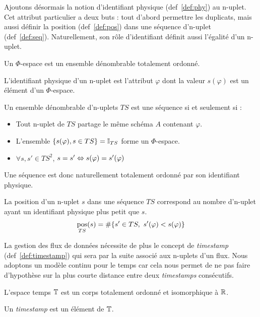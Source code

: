Ajoutons désormais la notion d'identifiant physique (def~\ref{def:phy}) au n-uplet. Cet attribut particulier a deux buts : tout d'abord permettre les duplicats, mais aussi définir la position (def~\ref{def:pos}) dans une séquence d'n-uplet (def~\ref{def:seq}). Naturellement, son rôle d'identifiant définit aussi l'égalité d'un n-uplet.
\begin{defi}\label{def:phy}
    Un $\Phi$-espace est un ensemble dénombrable totalement ordonné.

    L'identifiant physique d'un n-uplet est l'attribut $\varphi$ dont la valeur $s(\varphi)$ est un élément d'un $\Phi$-espace.
\end{defi}
\begin{defi}\label{def:seq}
    Un ensemble dénombrable d'n-uplets $TS$ est une séquence si et seulement si : 
    \begin{itemize}
     \item Tout n-uplet de $TS$ partage le même schéma $A$ contenant $\varphi$.
     \item L'ensemble $\{s(\varphi), s\in TS\} = \mathbb{I}_{TS}$ forme un $\Phi$-espace.
     \item $\forall s,s' \in TS^2$, $s = s' \Leftrightarrow s(\varphi) = s'(\varphi)$
    \end{itemize}

    Une séquence est donc naturellement totalement ordonné par son identifiant physique.
\end{defi}
\begin{defi}\label{def:pos}
    La position d'un n-uplet $s$ dans une séquence $TS$ correspond au nombre d'n-uplet ayant un identifiant physique plus petit que $s$.
    $$\mathop{\mathrm{pos}}_{TS}(s) = \#\{s'\in TS,\ s'(\varphi) < s(\varphi) \}$$
\end{defi}

La gestion des flux de données nécessite de plus le concept de \textit{timestamp} (def~\ref{def:timestamp}) qui sera par la suite associé aux n-uplets d'un flux. Nous adoptons un modèle continu pour le temps car cela nous permet de ne pas faire d'hypothèse sur la plus courte distance entre deux \textit{timestamps} consécutifs.
\begin{defi}[Timestamp]\label{def:timestamp}
    L'espace temps $\mathbb{T}$ est un corps totalement ordonné et isomorphique à $\mathbb{R}$. 

    Un \textit{timestamp} est un élément de $\mathbb{T}$.
\end{defi}

